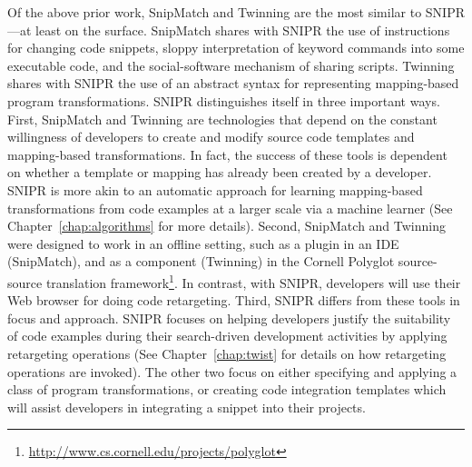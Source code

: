 Of the above prior work, SnipMatch and Twinning are the most similar to \uppercase{SnipR}---at least on the surface. SnipMatch shares with \uppercase{SnipR} the use of instructions for changing code snippets, sloppy interpretation of keyword commands into some executable code, and the social-software mechanism of sharing scripts. Twinning shares with \uppercase{SnipR} the use of an abstract syntax for representing mapping-based program transformations. \uppercase{SnipR} distinguishes itself in three important ways. First, SnipMatch and Twinning are technologies that depend on the constant willingness of developers to create and modify source code templates and mapping-based transformations. In fact, the success of these tools is dependent on whether a template or mapping has already been created by a developer. \uppercase{SnipR} is more akin to an automatic approach for learning mapping-based transformations from code examples at a larger scale via a machine learner (See Chapter~\ref{chap:algorithms} for more details). Second, SnipMatch and Twinning were designed to work in an offline setting, such as a plugin in an IDE (SnipMatch), and as a component (Twinning) in the Cornell Polyglot source-source translation framework\footnote{\url{http://www.cs.cornell.edu/projects/polyglot}}. In contrast, with \uppercase{SnipR}, developers will use their Web browser for doing code retargeting. Third, \uppercase{SnipR} differs from these tools in focus and approach. \uppercase{SnipR} focuses on helping developers justify the suitability of code examples during their search-driven development activities by applying retargeting operations (See Chapter~\ref{chap:twist} for details on how retargeting operations are invoked). The other two focus on either specifying and applying a class of program transformations, or creating code integration templates which will assist developers in integrating a snippet into their projects.  
